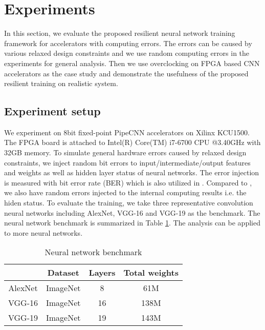 \section{Experiments} \label{sec:casestudy}
In this section, we evaluate the proposed resilient neural network training 
framework for accelerators with computing errors. The errors can be caused by 
various relaxed design constraints and we use random computing errors in 
the experiments for general analysis. Then we use overclocking on FPGA based 
CNN accelerators as the case study and demonstrate the usefulness of the 
proposed resilient training on realistic system.

\subsection{Experiment setup}
We experiment on 8bit fixed-point PipeCNN \cite{pipecnn_2} accelerators on Xilinx KCU1500.
The FPGA board is attached to Intel(R) Core(TM) i7-6700 CPU @3.40GHz with 32GB memory.
To simulate general hardware errors caused by relaxed design constraints, we 
inject random bit errors to input/intermediate/output features and weights as well as 
hidden layer status of neural networks. The error injection is measured with 
bit error rate (BER) which is also utilized in \cite{B2018ARES}. Compared to \cite{B2018ARES},
we also have random errors injected to the internal computing results i.e. the hiden status. 
To evaluate the training, we take three representative convolution 
neural networks including AlexNet, VGG-16 and VGG-19 as the benchmark. 
The neural network benchmark is summarized in Table \ref{tab:CNN-table}. 
The analysis can be applied to more neural networks.

\begin{table}[h]
        \centering
        \vspace{-0.3em}
        \caption{Neural network benchmark}
        \label{tab:CNN-table}
        \vspace{-0.3em}
        \begin{tabular}{c|c|c|c}
		\toprule
		  & Dataset & Layers & Total weights \\
		\midrule
		AlexNet & ImageNet & 8 & 61M \\
		\midrule
		VGG-16 & ImageNet & 16 & 138M \\
		\midrule
		VGG-19 & ImageNet & 19 & 143M \\
		\bottomrule
        \end{tabular}
        \vspace{-1em}
\end{table}

